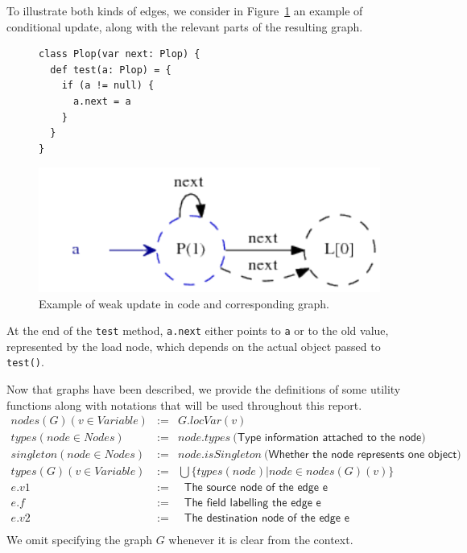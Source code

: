 To illustrate both kinds of edges, we consider in Figure~\ref{fig:pt:weak1graph} an
example of conditional update, along with the relevant parts of the resulting graph.
\begin{figure}[h]
\begin{minipage}[tl]{0.6\linewidth}
    \centering
\lstset{linewidth=0.6\linewidth}
\begin{lstlisting}
class Plop(var next: Plop) {
  def test(a: Plop) = {
    if (a != null) {
      a.next = a
    }
  }
}
\end{lstlisting}
\end{minipage}
\begin{minipage}[tr]{0.5\linewidth}
    \centering
    \includegraphics[scale=0.8]{images/pt_weak1graph}
\end{minipage}
    \caption{Example of weak update in code and corresponding graph.}
    \label{fig:pt:weak1graph}
\end{figure}
At the end of the \verb/test/ method, \verb/a.next/ either points to \verb/a/ or to
the old value, represented by the load node, which depends on the actual object
passed to \verb/test()/.


Now that graphs have been described, we provide the definitions of some utility
functions along with notations that will be used throughout this report.
\begin{eqnarray*}
    nodes(G)(v \in Variable)  &:=& G.locVar(v) \\
    types(node \in Nodes)     &:=& node.types ~\textsf{(Type information attached to the node)} \\
    singleton(node \in Nodes) &:=& node.isSingleton ~\textsf{(Whether the node represents one object)} \\
    types(G)(v \in Variable)  &:=& \bigcup \{ types(node) | node \in nodes(G)(v) \} \\
    e.v1  &:=& ~\textsf{ The source node of the edge e} \\
    e.f  &:=& ~\textsf{ The field labelling the edge e} \\
    e.v2  &:=& ~\textsf{ The destination node of the edge e} \\
\end{eqnarray*}
We omit specifying the graph $G$ whenever it is clear from the context.


